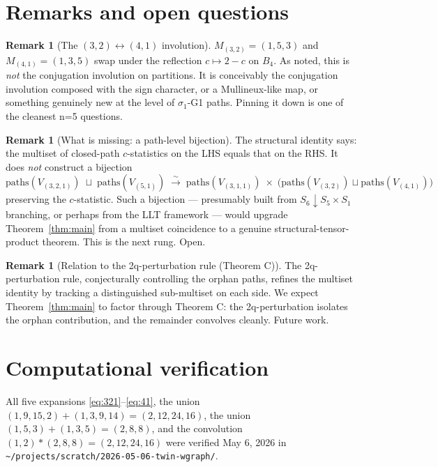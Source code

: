 \documentclass[11pt]{article}
\theoremstyle{definition}
\newtheorem{remark}[theorem]{Remark}
\begin{document}
\section{Remarks and open questions}

\begin{remark}[The $(3,2) \leftrightarrow (4,1)$ involution]
$M_{(3,2)} = (1,5,3)$ and $M_{(4,1)} = (1,3,5)$ swap under the reflection $c \mapsto 2-c$ on $B_4$. As noted, this is \emph{not} the conjugation involution on partitions. It is conceivably the conjugation involution composed with the sign character, or a Mullineux-like map, or something genuinely new at the level of $\sigma_1$-G1 paths. Pinning it down is one of the cleanest n=5 questions.
\end{remark}

\begin{remark}[What is missing: a path-level bijection]
The structural identity says: the multiset of closed-path $c$-statistics on the LHS equals that on the RHS. It does \emph{not} construct a bijection
\[
\mathrm{paths}(V_{(3,2,1)}) \;\sqcup\; \mathrm{paths}(V_{(5,1)}) \;\xrightarrow{\;\sim\;}\; \mathrm{paths}(V_{(3,1,1)}) \;\times\; \bigl(\mathrm{paths}(V_{(3,2)}) \sqcup \mathrm{paths}(V_{(4,1)})\bigr)
\]
preserving the $c$-statistic. Such a bijection — presumably built from $S_6 \downarrow S_5 \times S_1$ branching, or perhaps from the LLT framework — would upgrade Theorem~\ref{thm:main} from a multiset coincidence to a genuine structural-tensor-product theorem. This is the next rung. Open.
\end{remark}

\begin{remark}[Relation to the 2q-perturbation rule (Theorem C)]
The 2q-perturbation rule, conjecturally controlling the orphan paths, refines the multiset identity by tracking a distinguished sub-multiset on each side. We expect Theorem~\ref{thm:main} to factor through Theorem C: the 2q-perturbation isolates the orphan contribution, and the remainder convolves cleanly. Future work.
\end{remark}

\section*{Computational verification}

All five expansions \eqref{eq:321}--\eqref{eq:41}, the union $(1,9,15,2)+(1,3,9,14) = (2,12,24,16)$, the union $(1,5,3)+(1,3,5)=(2,8,8)$, and the convolution $(1,2) \ast (2,8,8) = (2,12,24,16)$ were verified May 6, 2026 in \texttt{\textasciitilde/projects/scratch/2026-05-06-twin-wgraph/}.
\end{document}
